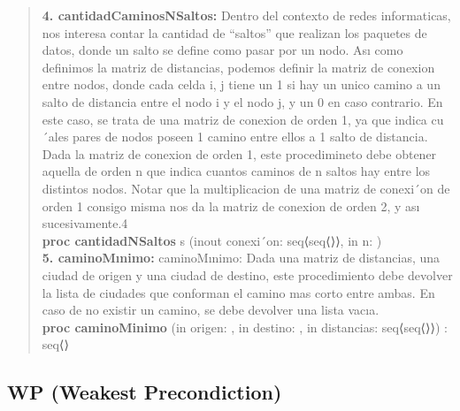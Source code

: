 \documentclass[10pt,a4paper]{article}
\begin{document}
\begin{quote}
\textbf{4. cantidadCaminosNSaltos:} Dentro del contexto de redes informaticas, nos interesa contar la cantidad de “saltos”
que realizan los paquetes de datos, donde un salto se define como pasar por un nodo.
Ası como definimos la matriz de distancias, podemos definir la matriz de conexion entre nodos, donde cada celda i, j
tiene un 1 si hay un unico camino a un salto de distancia entre el nodo i y el nodo j, y un 0 en caso contrario. En este
caso, se trata de una matriz de conexion de orden 1, ya que indica cu´ales pares de nodos poseen 1 camino entre ellos a
1 salto de distancia.
Dada la matriz de conexion de orden 1, este procedimineto debe obtener aquella de orden n que indica cuantos caminos
de n saltos hay entre los distintos nodos. Notar que la multiplicacion de una matriz de conexi´on de orden 1 consigo
misma nos da la matriz de conexion de orden 2, y ası sucesivamente.4
\\
\vspace{0.2cm}
\textbf{proc cantidadNSaltos } s (inout conexi´on: seq⟨seq⟨\ent⟩⟩, in n: \ent)
\vspace{0.2cm}
\\
\vspace{0.2cm}
\textbf{5. caminoMınimo:} caminoMınimo: Dada una matriz de distancias, una ciudad de origen y una ciudad de destino, este procedimiento
debe devolver la lista de ciudades que conforman el camino mas corto entre ambas. En caso de no existir un camino,
se debe devolver una lista vacıa.
\\
\textbf{proc caminoMinimo} (in origen: \ent, in destino: \ent, in distancias: seq⟨seq⟨\ent⟩⟩) : seq⟨\ent⟩
\end {quote}
\subsection{WP (Weakest Precondiction)}
\end{document}
